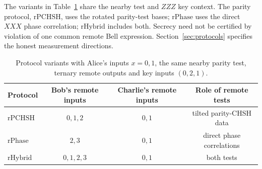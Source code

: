 \documentclass[aps,10pt,onecolumn,prx,superscriptaddress,longbibliography,nofootinbib]{revtex4-2}
\newcommand{\rPCHSH}{\mathrm{rPCHSH}}
\newcommand{\rPhase}{\mathrm{rPhase}}
\newcommand{\rHybrid}{\mathrm{rHybrid}}
\begin{document}
The variants in Table~\ref{tab:protocol-family} share the nearby test and \(ZZZ\) key context. The parity protocol, \(\rPCHSH\), uses the rotated parity-test bases; \(\rPhase\) uses the direct \(XXX\) phase correlation; \(\rHybrid\) includes both. Secrecy need not be certified by violation of one common remote Bell expression. Section~\ref{sec:protocols} specifies the honest measurement directions.

\begin{table}[t]
\caption{Protocol variants with Alice's inputs $x=0,1$, the same nearby parity test, ternary remote outputs and key inputs $(0,2,1)$.}
\label{tab:protocol-family}
\begin{ruledtabular}
\begin{tabular}{lccc}
Protocol & Bob's remote inputs & Charlie's remote inputs & Role of remote tests\\
\hline
\(\rPCHSH\) & $0,1,2$ & $0,1$ & tilted parity-CHSH data\\
\(\rPhase\) & $2,3$ & $0,1$ & direct phase correlations\\
\(\rHybrid\) & $0,1,2,3$ & $0,1$ & both tests
\end{tabular}
\end{ruledtabular}
\end{table}
\end{document}
